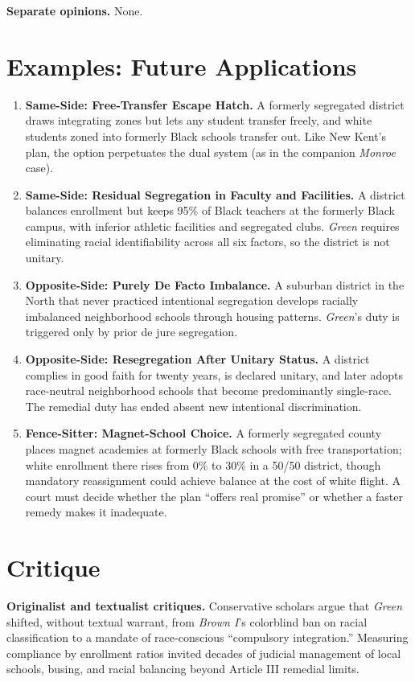 \documentclass[12pt]{article}
\begin{document}
\textbf{Separate opinions.} None.

\section{Examples: Future Applications}

\begin{enumerate}
\item \textbf{Same-Side: Free-Transfer Escape Hatch.} A formerly segregated district draws integrating zones but lets any student transfer freely, and white students zoned into formerly Black schools transfer out. Like New Kent's plan, the option perpetuates the dual system (as in the companion \textit{Monroe} case).
\item \textbf{Same-Side: Residual Segregation in Faculty and Facilities.} A district balances enrollment but keeps 95\% of Black teachers at the formerly Black campus, with inferior athletic facilities and segregated clubs. \textit{Green} requires eliminating racial identifiability across all six factors, so the district is not unitary.
\item \textbf{Opposite-Side: Purely De Facto Imbalance.} A suburban district in the North that never practiced intentional segregation develops racially imbalanced neighborhood schools through housing patterns. \textit{Green}'s duty is triggered only by prior de jure segregation.
\item \textbf{Opposite-Side: Resegregation After Unitary Status.} A district complies in good faith for twenty years, is declared unitary, and later adopts race-neutral neighborhood schools that become predominantly single-race. The remedial duty has ended absent new intentional discrimination.
\item \textbf{Fence-Sitter: Magnet-School Choice.} A formerly segregated county places magnet academies at formerly Black schools with free transportation; white enrollment there rises from 0\% to 30\% in a 50/50 district, though mandatory reassignment could achieve balance at the cost of white flight. A court must decide whether the plan ``offers real promise'' or whether a faster remedy makes it inadequate.
\end{enumerate}

\section{Critique}

\textbf{Originalist and textualist critiques.} Conservative scholars argue that \textit{Green} shifted, without textual warrant, from \textit{Brown I}'s colorblind ban on racial classification to a mandate of race-conscious ``compulsory integration.'' Measuring compliance by enrollment ratios invited decades of judicial management of local schools, busing, and racial balancing beyond Article III remedial limits.
\end{document}
